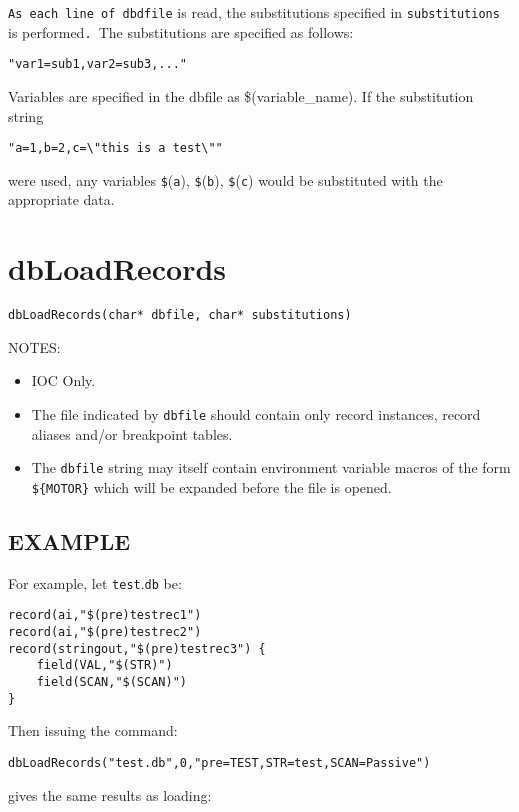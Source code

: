 \verb|As each line of dbdfile| is read, the substitutions specified in \verb|substitutions| is performed\verb|. |The 
substitutions are specified as follows:

\begin{verbatim}"var1=sub1,var2=sub3,..."
\end{verbatim}Variables are specified in the dbfile as \$(variable\_name). If the substitution string

\begin{verbatim}"a=1,b=2,c=\"this is a test\""
\end{verbatim}were used, any variables \verb|$|(\verb|a|), \verb|$|(\verb|b|), \verb|$|(\verb|c|) would be substituted with the appropriate data.

\section{dbLoadRecords}

\begin{verbatim}dbLoadRecords(char* dbfile, char* substitutions)
\end{verbatim}NOTES:

\begin{itemize}\item IOC Only.

\item The file indicated by \verb|dbfile| should contain only record instances, record aliases and/or breakpoint tables.

\item The \verb|dbfile| string may itself contain environment variable macros of the form \verb|${MOTOR}| which will be 
expanded before the file is opened.

\end{itemize}\subsection{EXAMPLE}

For example, let \verb|test|.\verb|db| be:

\begin{verbatim}
record(ai,"$(pre)testrec1")
record(ai,"$(pre)testrec2")
record(stringout,"$(pre)testrec3") {
    field(VAL,"$(STR)")
    field(SCAN,"$(SCAN)")
}
\end{verbatim}Then issuing the command:

\begin{verbatim}dbLoadRecords("test.db",0,"pre=TEST,STR=test,SCAN=Passive")
\end{verbatim}gives the same results as loading:

